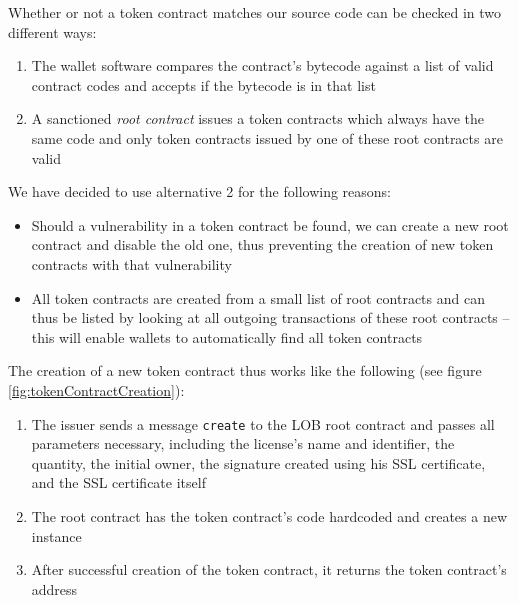\documentclass[a4paper]{article}
\begin{document}
Whether or not a token contract matches our source code can be checked in two different ways:
\begin{enumerate}
  \item The wallet software compares the contract's bytecode against a list of valid contract codes and accepts if the bytecode is in that list
  \item A sanctioned \emph{root contract} issues a token contracts which always have the same code and only token contracts issued by one of these root contracts are valid
\end{enumerate}

We have decided to use alternative 2 for the following reasons:
\begin{itemize}
  \item Should a vulnerability in a token contract be found, we can create a new root contract and disable the old one, thus preventing the creation of new token contracts with that vulnerability
  \item All token contracts are created from a small list of root contracts and can thus be listed by looking at all outgoing transactions of these root contracts – this will enable wallets to automatically find all token contracts
\end{itemize}

The creation of a new token contract thus works like the following (see figure \ref{fig:tokenContractCreation}):
\begin{enumerate}
  \item The issuer sends a message \texttt{create} to the LOB root contract and passes all parameters necessary, including the license's name and identifier, the quantity, the initial owner, the signature created using his SSL certificate, and the SSL certificate itself
  \item The root contract has the token contract's code hardcoded and creates a new instance
  \item After successful creation of the token contract, it returns the token contract's address
\end{enumerate}
\end{document}

